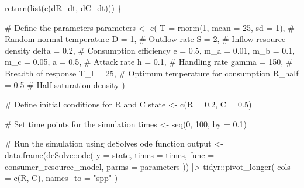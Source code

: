 \documentclass[
  letterpaper,
  DIV=11,
  numbers=noendperiod]{scrartcl}
\newenvironment{Shaded}{\begin{snugshade}}{\end{snugshade}}
\newcommand{\AttributeTok}[1]{\textcolor[rgb]{0.40,0.45,0.13}{#1}}
\newcommand{\CommentTok}[1]{\textcolor[rgb]{0.37,0.37,0.37}{#1}}
\newcommand{\DecValTok}[1]{\textcolor[rgb]{0.68,0.00,0.00}{#1}}
\newcommand{\FloatTok}[1]{\textcolor[rgb]{0.68,0.00,0.00}{#1}}
\newcommand{\FunctionTok}[1]{\textcolor[rgb]{0.28,0.35,0.67}{#1}}
\newcommand{\NormalTok}[1]{\textcolor[rgb]{0.00,0.23,0.31}{#1}}
\newcommand{\OtherTok}[1]{\textcolor[rgb]{0.00,0.23,0.31}{#1}}
\newcommand{\SpecialCharTok}[1]{\textcolor[rgb]{0.37,0.37,0.37}{#1}}
\newcommand{\StringTok}[1]{\textcolor[rgb]{0.13,0.47,0.30}{#1}}
\begin{document}
\begin{Shaded}
\begin{Highlighting}[]
    \FunctionTok{return}\NormalTok{(}\FunctionTok{list}\NormalTok{(}\FunctionTok{c}\NormalTok{(dR\_dt, dC\_dt)))}
\NormalTok{\}}

\CommentTok{\# Define the parameters}
\NormalTok{parameters }\OtherTok{\textless{}{-}} \FunctionTok{c}\NormalTok{(}
    \AttributeTok{T =} \FunctionTok{rnorm}\NormalTok{(}\DecValTok{1}\NormalTok{, }\AttributeTok{mean =} \DecValTok{25}\NormalTok{, }\AttributeTok{sd =} \DecValTok{1}\NormalTok{), }\CommentTok{\# Random normal temperature}
    \AttributeTok{D =} \DecValTok{1}\NormalTok{, }\CommentTok{\# Outflow rate}
    \AttributeTok{S =} \DecValTok{2}\NormalTok{, }\CommentTok{\# Inflow resource density}
    \AttributeTok{delta =} \FloatTok{0.2}\NormalTok{, }\CommentTok{\# Consumption efficiency}
    \AttributeTok{e =} \FloatTok{0.5}\NormalTok{,}
    \AttributeTok{m\_a =} \FloatTok{0.01}\NormalTok{,}
    \AttributeTok{m\_b =} \FloatTok{0.1}\NormalTok{,}
    \AttributeTok{m\_c =} \FloatTok{0.05}\NormalTok{,}
    \AttributeTok{a =} \FloatTok{0.5}\NormalTok{, }\CommentTok{\# Attack rate}
    \AttributeTok{h =} \FloatTok{0.1}\NormalTok{, }\CommentTok{\# Handling rate}
    \AttributeTok{gamma =} \DecValTok{150}\NormalTok{, }\CommentTok{\# Breadth of response}
    \AttributeTok{T\_I =} \DecValTok{25}\NormalTok{, }\CommentTok{\# Optimum temperature for consumption}
    \AttributeTok{R\_half =} \FloatTok{0.5} \CommentTok{\# Half{-}saturation density}
\NormalTok{)}

\CommentTok{\# Define initial conditions for R and C}
\NormalTok{state }\OtherTok{\textless{}{-}} \FunctionTok{c}\NormalTok{(}\AttributeTok{R =} \FloatTok{0.2}\NormalTok{, }\AttributeTok{C =} \FloatTok{0.5}\NormalTok{)}

\CommentTok{\# Set time points for the simulation}
\NormalTok{times }\OtherTok{\textless{}{-}} \FunctionTok{seq}\NormalTok{(}\DecValTok{0}\NormalTok{, }\DecValTok{100}\NormalTok{, }\AttributeTok{by =} \FloatTok{0.1}\NormalTok{)}

\CommentTok{\# Run the simulation using deSolve\textquotesingle{}s ode function}
\NormalTok{output }\OtherTok{\textless{}{-}} \FunctionTok{data.frame}\NormalTok{(deSolve}\SpecialCharTok{::}\FunctionTok{ode}\NormalTok{(}
    \AttributeTok{y =}\NormalTok{ state, }\AttributeTok{times =}\NormalTok{ times,}
    \AttributeTok{func =}\NormalTok{ consumer\_resource\_model,}
    \AttributeTok{parms =}\NormalTok{ parameters}
\NormalTok{)) }\SpecialCharTok{|\textgreater{}}
\NormalTok{    tidyr}\SpecialCharTok{::}\FunctionTok{pivot\_longer}\NormalTok{(}
        \AttributeTok{cols =} \FunctionTok{c}\NormalTok{(R, C),}
        \AttributeTok{names\_to =} \StringTok{"spp"}
\NormalTok{    )}



\end{Highlighting}
\end{Shaded}
\end{document}
